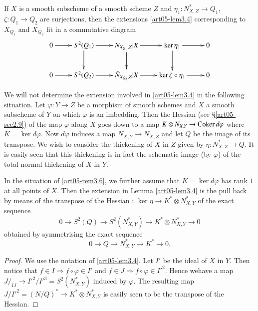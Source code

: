 \begin{lemma}\label{art05-lem3.5}
If $X$ is a smooth subscheme of a smooth scheme $Z$ and
$\eta_{1}:N^{*}_{X,Z}\to Q_{1}$, $\zeta:Q_{1}\to Q_{2}$ are
surjections, then the extensions \ref{art05-lem3.4} corresponding to
$X_{Q_{1}}$ and $X_{Q_{2}}$ fit in a commutative diagram
\[
\xymatrix{
0\ar[r] & S^{2}(Q_{1})\ar[d]\ar[r] & N_{X_{Q_{1}},Z}|X\ar[d]\ar[r]
& \ker \eta_{1}\ar[d]\ar[r] & 0\\
0\ar[r] & S^{2}(Q_{2})\ar[r] & \check{N}_{X_{Q_{2}},Z}|X\ar[r]
& \ker \zeta\circ \eta_{1}\ar[r] & 0
}
\]
\end{lemma}

\begin{subremark}\label{art05-rem3.6}
We will not determine the extension involved in \ref{art05-lem3.4} in
the following situation. Let $\varphi:Y\to Z$ be a morphism of smooth
schemes and $X$ a smooth subscheme of $Y$ on which $\varphi$ is an
imbedding. Then the Hessian (see \S\ref{art05-sec2.9}) of the map
$\varphi$ along $X$ goes down to a map $K\otimes N_{X,Y}\to \operatorname{Coker}
d\varphi$ where $K=\ker d\varphi$. Now $d{\varphi}$ induces a map
$N_{X,Y}\to N_{X,Z}$ and let $Q$ be the image of its transpose. We
wish to consider the thickening of $X$ in $Z$ given by
$\eta:N^{*}_{X,Z}\to Q$. It is easily seen that this thickening is in
fact the schematic image (by $\varphi$) of the total normal thickening
of $X$ in $Y$.
\end{subremark}

\begin{lemma}\label{art05-lem3.7}
In the situation of \ref{art05-rem3.6}, we further assume that $K=\ker
d\varphi$ has rank $1$ at all points of $X$. Then the extension in
Lemma \ref{art05-lem3.4} is the pull back by means of the transpose of
the Hessian : $\ker\eta\to K^{*}\otimes N^{*}_{X,Y}$ of the exact
sequence
$$
0\to S^{2}(Q)\to S^{2}(N^{*}_{X,Y})\to K^{*}\otimes N^{*}_{X,Y}\to 0
$$
obtained by symmetrising the exact sequence
$$
0\to Q\to N^{*}_{X,Y}\to K^{*}\to 0.
$$
\end{lemma}

\begin{proof}
We use the notation of \ref{art05-lem3.4}. Let $I'$ be the ideal of
$X$ in $Y$. Then notice that $f\in I\Rightarrow f\circ \varphi\in I'$
and $f\in J\Rightarrow f\circ \varphi\in {I'}^{2}$. Hence
we\pageoriginale have a map $J/_{IJ}\to
{I'}^{2}/{I'}^{3}=S^{2}(N^{*}_{X,Y})$ induced by $\varphi$. The
resulting map $J/{I'}^{2}=(N/Q)^{*}\to K^{*}\otimes N^{*}_{X,Y}$ is
easily seen to be the transpose of the Hessian.
\end{proof}

